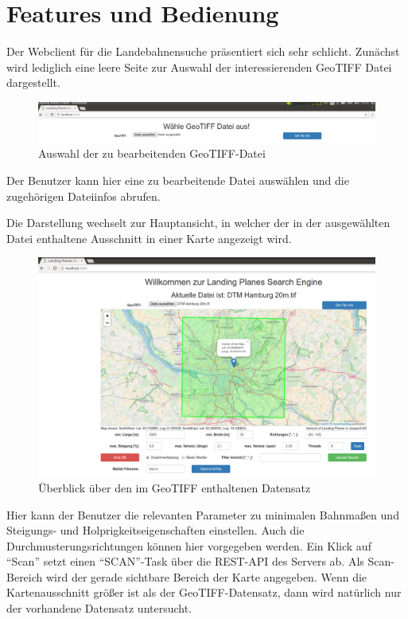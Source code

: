 \documentclass[10pt,a4paper]{report}
\begin{document}
\section{Features und Bedienung}


Der Webclient für die Landebahnensuche präsentiert sich sehr schlicht. Zunächst wird lediglich eine leere Seite zur Auswahl der interessierenden GeoTIFF Datei dargestellt.

\begin{figure}[ht]
	\includegraphics[width=\textwidth]{./drawings/LandingClient_Screen_Start.png}
	\caption{Auswahl der zu bearbeitenden GeoTIFF-Datei}
\end{figure}

Der Benutzer kann hier eine zu bearbeitende Datei auswählen und die zugehörigen Dateiinfos abrufen.

Die Darstellung wechselt zur Hauptansicht, in welcher der in der ausgewählten Datei enthaltene Ausschnitt in einer Karte angezeigt wird.
\begin{figure}[ht]
	\includegraphics[width=\textwidth]{./drawings/LandingClient_Screen_Ueberblick.png}
	\caption{Überblick über den im GeoTIFF enthaltenen Datensatz}
\end{figure}

Hier kann der Benutzer die relevanten Parameter zu minimalen Bahnmaßen und Steigungs- und Holprigkeitseigenschaften einstellen. Auch die Durchmusterungsrichtungen können hier vorgegeben werden. Ein Klick auf "`Scan"' setzt einen "`SCAN"'-Task über die REST-API des Servers ab. Als Scan-Bereich wird der gerade sichtbare Bereich der Karte angegeben. Wenn die Kartenausschnitt größer ist als der GeoTIFF-Datensatz, dann wird natürlich nur der vorhandene Datensatz untersucht.
\end{document}
